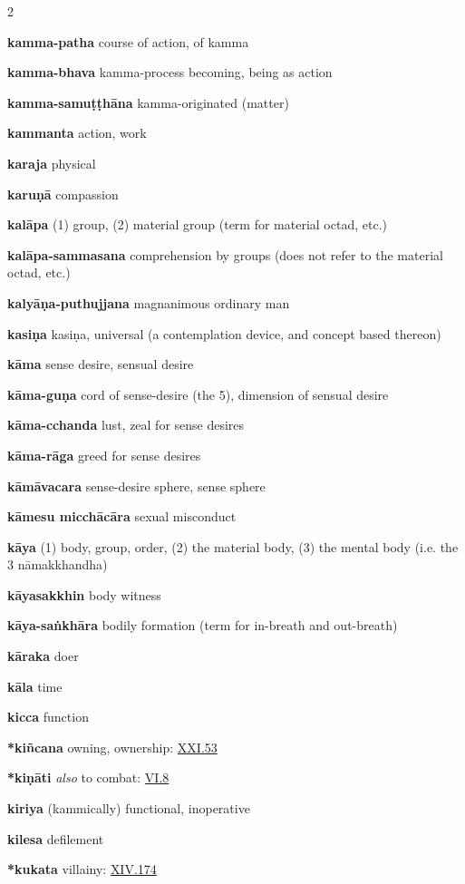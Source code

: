 \begin{multicols}{2}
\begin{vismHanging}
\par\textbf{kamma-patha} course of action, of kamma 
\par\textbf{kamma-bhava} kamma-process becoming, being as action 
\par\textbf{kamma-samuṭṭhāna} kamma-originated (matter) 
\par\textbf{kammanta} action, work
\par\textbf{karaja} physical
\par\textbf{karuṇā} compassion
\par\textbf{kalāpa} (1) group, (2) material group (term for material octad, etc.) 
\par\textbf{kalāpa-sammasana} comprehension by groups (does not refer to the material octad, etc.) 
\par\textbf{kalyāṇa-puthujjana} magnanimous ordinary man 
\par\textbf{kasiṇa} kasiṇa, universal (a contemplation device, and concept based thereon) 
\par\textbf{kāma} sense desire, sensual desire 
\par\textbf{kāma-guṇa} cord of sense-desire (the 5), dimension of sensual desire 
\par\textbf{kāma-cchanda} lust, zeal for sense desires 
\par\textbf{kāma-rāga} greed for sense desires
\par\textbf{kāmāvacara} sense-desire sphere, sense sphere 
\par\textbf{kāmesu micchācāra} sexual misconduct 
\par\textbf{kāya} (1) body, group, order, (2) the material body, (3) the mental body (i.e. the 3 nāmakkhandha) 
\par\textbf{kāyasakkhin} body witness
\par\textbf{kāya-saṅkhāra} bodily formation (term for in-breath and out-breath) 
\par\textbf{kāraka} doer
\par\textbf{kāla} time
\par\textbf{kicca} function
\par\textbf{*kiñcana} owning, ownership: \hyperlink{XXI.53}{XXI.53}{}
\par\textbf{*kiṇāti} \emph{also }to combat: \hyperlink{VI.8}{VI.8}{}
\par\textbf{kiriya} (kammically) functional, inoperative 
\par\textbf{kilesa} defilement
\par\textbf{*kukata} villainy: \hyperlink{XIV.174}{XIV.174}{}

\end{vismHanging}
\end{multicols}
